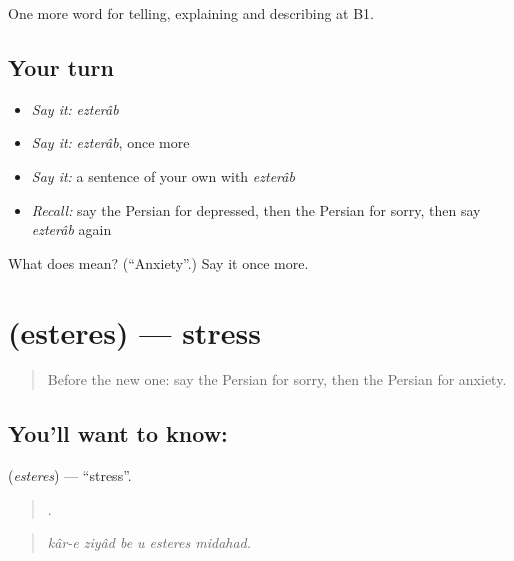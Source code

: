 \begin{grammarlens}[title={What you've built}]
One more word for telling, explaining and describing at B1.
\end{grammarlens}

\subsection*{Your turn}
\begin{itemize}
\raggedright
  \item \emph{Say it:} \emph{ezterâb}
  \item \emph{Say it:} \emph{ezterâb}, once more
  \item \emph{Say it:} a sentence of your own with \emph{ezterâb}
  \item \emph{Recall:} say the Persian for depressed, then the Persian for sorry, then say \emph{ezterâb} again
\end{itemize}

\begin{tcolorbox}[breakable,colback=teal!4,colframe=teal!35!black,title={Before you move on}]
What does  mean? (\textquotedblleft{}Anxiety\textquotedblright{}.) Say it once more.
\end{tcolorbox}
\section[\texorpdfstring{\fa{استرس} (esteres)}{استرس (esteres)}]{ (esteres) — stress}

\label{lesson:FA-C485-esteres}



\begin{quote}
Before the new one: say the Persian for sorry, then the Persian for anxiety.
\end{quote}

\subsection*{You'll want to know: }
\textbf{} (\emph{esteres}) — \textquotedblleft{}stress\textquotedblright{}.

\begin{quote}
     .
\end{quote}

\begin{quote}
\emph{kâr-e ziyâd be u esteres midahad.}
\end{quote}

